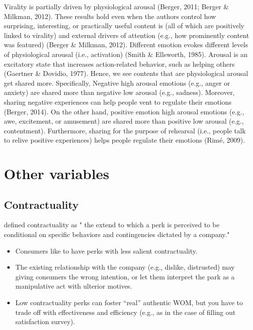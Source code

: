 \documentclass[
]{book}
\providecommand{\tightlist}{%
  \setlength{\itemsep}{0pt}\setlength{\parskip}{0pt}}
\begin{document}
Virality is partially driven by physiological arousal (Berger, 2011; Berger \& Milkman, 2012). These results hold even when the authors control how surprising, interesting, or practically useful content is (all of which are positively linked to virality) and external drivers of attention (e.g., how prominently content was featured) (Berger \& Milkman, 2012). Different emotion evokes different levels of physiological arousal (i.e., activation) (Smith \& Ellsworth, 1985). Arousal is an excitatory state that increases action-related behavior, such as helping others (Gaertner \& Dovidio, 1977). Hence, we see contents that are physiological arousal get shared more. Specifically, Negative high arousal emotions (e.g., anger or anxiety) are shared more than negative low arousal (e.g., sadness). Moreover, sharing negative experiences can help people vent to regulate their emotions (Berger, 2014). On the other hand, positive emotion high arousal emotions (e.g., awe, excitement, or amusement) are shared more than positive low arousal (e.g., contentment). Furthermore, sharing for the purpose of rehearsal (i.e., people talk to relive positive experiences) helps people regulate their emotions (Rimé, 2009).

\hypertarget{other-variables}{%
\section{Other variables}\label{other-variables}}

\hypertarget{contractuality}{%
\subsection{Contractuality}\label{contractuality}}

\citep{Lisjak_2021} defined contractuality as " the extend to which a perk is perceived to be conditional on specific behaviors and contingencies dictated by a company."

\begin{itemize}
\tightlist
\item
  Consumers like to have perks with less salient contractuality.
\item
  The existing relationship with the company (e.g., dislike, distrusted) may giving consumers the wrong intention, or let them interpret the park as a manipulative act with ulterior motives.
\item
  Low contractuality perks can foster ``real'' authentic WOM, but you have to trade off with effectiveness and efficiency (e.g., as in the case of filling out satisfaction survey).
\end{itemize}
\end{document}
